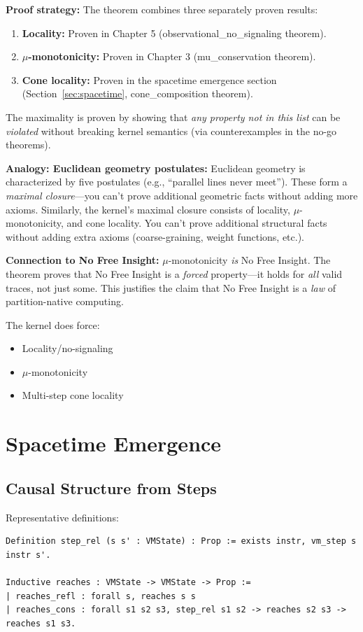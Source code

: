 \textbf{Proof strategy:} The theorem combines three separately proven results:
\begin{enumerate}
    \item \textbf{Locality:} Proven in Chapter 5 (observational\_no\_signaling theorem).
    \item \textbf{$\mu$-monotonicity:} Proven in Chapter 3 (mu\_conservation theorem).
    \item \textbf{Cone locality:} Proven in the spacetime emergence section (Section~\ref{sec:spacetime}, cone\_composition theorem).
\end{enumerate}
The maximality is proven by showing that \textit{any property not in this list} can be \textit{violated} without breaking kernel semantics (via counterexamples in the no-go theorems).

\textbf{Analogy: Euclidean geometry postulates:}
Euclidean geometry is characterized by five postulates (e.g., ``parallel lines never meet''). These form a \textit{maximal closure}---you can't prove additional geometric facts without adding more axioms. Similarly, the kernel's maximal closure consists of locality, $\mu$-monotonicity, and cone locality. You can't prove additional structural facts without adding extra axioms (coarse-graining, weight functions, etc.).

\textbf{Connection to No Free Insight:} $\mu$-monotonicity \textit{is} No Free Insight. The theorem proves that No Free Insight is a \textit{forced} property---it holds for \textit{all} valid traces, not just some. This justifies the claim that No Free Insight is a \textit{law} of partition-native computing.


The kernel does force:
\begin{itemize}
    \item Locality/no-signaling
    \item $\mu$-monotonicity
    \item Multi-step cone locality
\end{itemize}

\section{Spacetime Emergence}

\subsection{Causal Structure from Steps}

Representative definitions:
\begin{lstlisting}
Definition step_rel (s s' : VMState) : Prop := exists instr, vm_step s instr s'.

Inductive reaches : VMState -> VMState -> Prop :=
| reaches_refl : forall s, reaches s s
| reaches_cons : forall s1 s2 s3, step_rel s1 s2 -> reaches s2 s3 -> reaches s1 s3.
\end{lstlisting}

